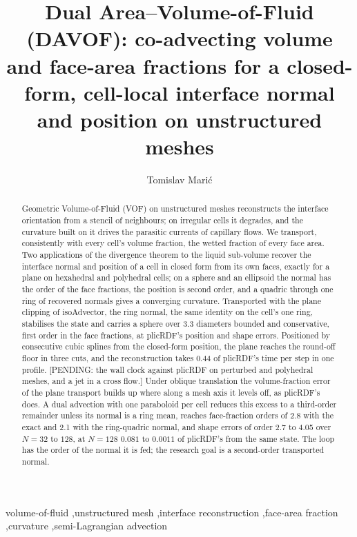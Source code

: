 \documentclass[preprint,12pt]{elsarticle}
\begin{document}
\frenchspacing

\begin{frontmatter}

\title{Dual Area--Volume-of-Fluid (DAVOF): co-advecting volume and face-area fractions for a closed-form, cell-local interface normal and position on unstructured meshes}

\author[mma]{Tomislav Mari\'{c}}
\address[mma]{Mathematical Modeling and Analysis, Department of Mathematics, Technical University of Darmstadt, Peter-Gr\"unberg-Stra{\ss}e 10, 64287 Darmstadt, Germany}

\begin{abstract}
Geometric Volume-of-Fluid (VOF) on unstructured meshes reconstructs the interface orientation from a stencil of neighbours; on irregular cells it degrades, and the curvature built on it drives the parasitic currents of capillary flows. We transport, consistently with every cell's volume fraction, the wetted fraction of every face area. Two applications of the divergence theorem to the liquid sub-volume recover the interface normal and position of a cell in closed form from its own faces, exactly for a plane on hexahedral and polyhedral cells; on a sphere and an ellipsoid the normal has the order of the face fractions, the position is second order, and a quadric through one ring of recovered normals gives a converging curvature. Transported with the plane clipping of isoAdvector, the ring normal, the same identity on the cell's one ring, stabilises the state and carries a sphere over 3.3 diameters bounded and conservative, first order in the face fractions, at plicRDF's position and shape errors. Positioned by consecutive cubic splines from the closed-form position, the plane reaches the round-off floor in three cuts, and the reconstruction takes $0.44$ of plicRDF's time per step in one profile. [PENDING: the wall clock against plicRDF on perturbed and polyhedral meshes, and a jet in a cross flow.] Under oblique translation the volume-fraction error of the plane transport builds up where along a mesh axis it levels off, as plicRDF's does. A dual advection with one paraboloid per cell reduces this excess to a third-order remainder unless its normal is a ring mean, reaches face-fraction orders of 2.8 with the exact and 2.1 with the ring-quadric normal, and shape errors of order 2.7 to 4.05 over $N = 32$ to $128$, at $N = 128$ $0.081$ to $0.0011$ of plicRDF's from the same state. The loop has the order of the normal it is fed; the research goal is a second-order transported normal.
\end{abstract}

\begin{keyword}
volume-of-fluid \sep unstructured mesh \sep interface reconstruction \sep face-area fraction \sep curvature \sep semi-Lagrangian advection
\end{keyword}

\end{frontmatter}
\end{document}
